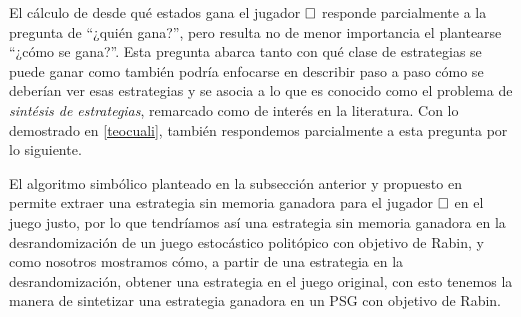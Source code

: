 El cálculo de desde qué estados gana el jugador $\square$ responde parcialmente a
la pregunta de ``¿quién gana?'', pero resulta no de menor importancia el
plantearse ``¿cómo se gana?''. Esta pregunta abarca tanto con qué clase de
estrategias se puede ganar como también podría enfocarse en describir paso a
paso cómo se deberían ver esas estrategias y se asocia a lo que es conocido
como el problema de \textit{sintésis de estrategias}, remarcado como de interés
en la literatura. Con lo demostrado en \ref{teocuali}, también respondemos
parcialmente a esta pregunta por lo siguiente.

El algoritmo simbólico planteado en la subsección anterior y propuesto en
\cite{Banerjee} permite extraer una estrategia sin memoria ganadora para el
jugador $\square$ en el juego justo, por lo que tendríamos así una estrategia sin
memoria ganadora en la desrandomización de un juego estocástico politópico con
objetivo de Rabin, y como nosotros mostramos cómo, a partir de una estrategia
en la desrandomización, obtener una estrategia en el juego original, con esto
tenemos la manera de sintetizar una estrategia ganadora en un PSG con objetivo
de Rabin.



